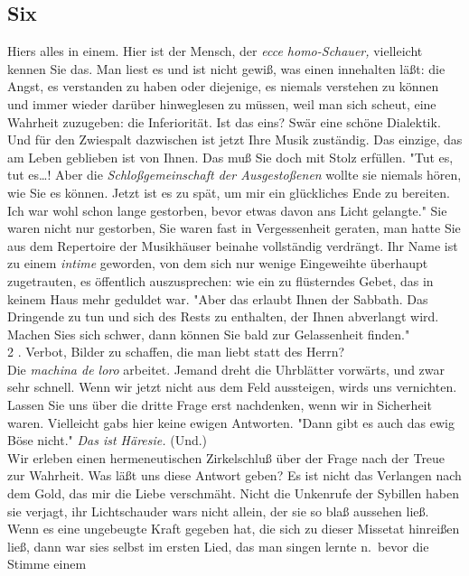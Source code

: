 \documentclass[
]{article}
\author{}
\date{\vspace{-2.5em}}
\begin{document}
\subsection{Six}\label{six}

Hiers alles in einem. Hier ist der Mensch, der \emph{ecce homo-Schauer,}
vielleicht kennen Sie das. Man liest es und ist nicht gewiß, was einen
innehalten läßt: die Angst, es verstanden zu haben oder diejenige, es
niemals verstehen zu können und immer wieder darüber hinweglesen zu
müssen, weil man sich scheut, eine Wahrheit zuzugeben: die Inferiorität.
Ist das eins? Swär eine schöne Dialektik. Und für den Zwiespalt
dazwischen ist jetzt Ihre Musik zuständig. Das einzige, das am Leben
geblieben ist von Ihnen. Das muß Sie doch mit Stolz erfüllen. "Tut es,
tut es\ldots! Aber die \emph{Schloßgemeinschaft der Ausgestoßenen}
wollte sie niemals hören, wie Sie es können. Jetzt ist es zu spät, um
mir ein glückliches Ende zu bereiten. Ich war wohl schon lange
gestorben, bevor etwas davon ans Licht gelangte." Sie waren nicht nur
gestorben, Sie waren fast in Vergessenheit geraten, man hatte Sie aus
dem Repertoire der Musikhäuser beinahe vollständig verdrängt. Ihr Name
ist zu einem \emph{intime} geworden, von dem sich nur wenige Eingeweihte
überhaupt zugetrauten, es öffentlich auszusprechen: wie ein zu
flüsterndes Gebet, das in keinem Haus mehr geduldet war. "Aber das
erlaubt Ihnen der Sabbath. Das Dringende zu tun und sich des Rests zu
enthalten, der Ihnen abverlangt wird. Machen Sies sich schwer, dann
können Sie bald zur Gelassenheit finden."\\
2 . Verbot, Bilder zu schaffen, die man liebt statt des Herrn?\\
Die \emph{machina de l\textquotesingle oro }arbeitet. Jemand dreht die
Uhrblätter vorwärts, und zwar sehr schnell. Wenn wir jetzt nicht aus dem
Feld aussteigen, wirds uns vernichten. Lassen Sie uns über die dritte
Frage erst nachdenken, wenn wir in Sicherheit waren. Vielleicht gabs
hier keine ewigen Antworten. "Dann gibt es auch das ewig Böse nicht."
\emph{Das ist Häresie.} (Und.)\\
Wir erleben einen hermeneutischen Zirkelschluß über der Frage nach der
Treue zur Wahrheit. Was läßt uns diese Antwort geben? Es ist nicht das
Verlangen nach dem Gold, das mir die Liebe verschmäht. Nicht die
Unkenrufe der Sybillen haben sie verjagt, ihr Lichtschauder wars nicht
allein, der sie so blaß aussehen ließ. Wenn es eine ungebeugte Kraft
gegeben hat, die sich zu dieser Missetat hinreißen ließ, dann war sies
selbst im ersten Lied, das man singen lernte n.~bevor die Stimme einem
\end{document}
